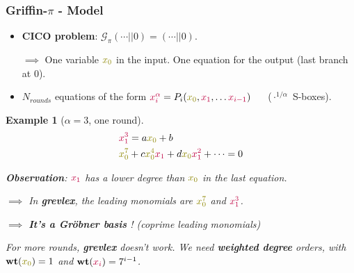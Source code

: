 \documentclass[aspectratio=169]{beamer}
\newtheorem{exemple}{Example}
\begin{document}
\begin{frame}
  \frametitle{Griffin-$\pi$ - Model}
  \begin{itemize}
  \item \textbf{CICO problem}: $\mathcal{G}_\pi(\cdots || 0) = (\cdots || 0)$.

    $\implies$ One variable $\textcolor{olive}{x_0}$ in the input. One equation for the output (last branch at 0).
  \item $N_{rounds}$ equations of the form $\textcolor{purple}{x_i^\alpha} = P_i(\textcolor{olive}{x_0}, \textcolor{purple}{x_1}, \ldots \textcolor{purple}{x_{i-1}})$ $\quad$ ($\cdot^{1/\alpha}$ S-boxes).
  \end{itemize}

  \begin{exemple}[$\alpha = 3$, one round]
    \vspace{-20pt}
    \begin{align*}
      &\textcolor{purple}{x_1^3} = a\textcolor{olive}{x_0} + b \\
      &\textcolor{olive}{x_0^7} + c\textcolor{olive}{x_0^4}\textcolor{purple}{x_1} + d\textcolor{olive}{x_0}\textcolor{purple}{x_1^2} + \cdots = 0
    \end{align*}

    \pause
    
    \textbf{Observation}: $\textcolor{purple}{x_1}$ has a lower degree than $\textcolor{olive}{x_0}$ in the last equation.

    $\implies$ In \textbf{grevlex}, the leading monomials are $\textcolor{olive}{x_0^7}$ and $\textcolor{purple}{x_1^3}$.

    
    $\implies$ \textbf{It's a Gröbner basis} ! (coprime leading monomials)

    \pause
    
    For more rounds, \textbf{grevlex} doesn't work. We need \textbf{weighted degree} orders, with $\mathbf{wt}(\textcolor{olive}{x_0})=1$ and $\mathbf{wt}(\textcolor{purple}{x_i})=7^{i-1}$.
  \end{exemple}
\end{frame}



%       
\end{document}

